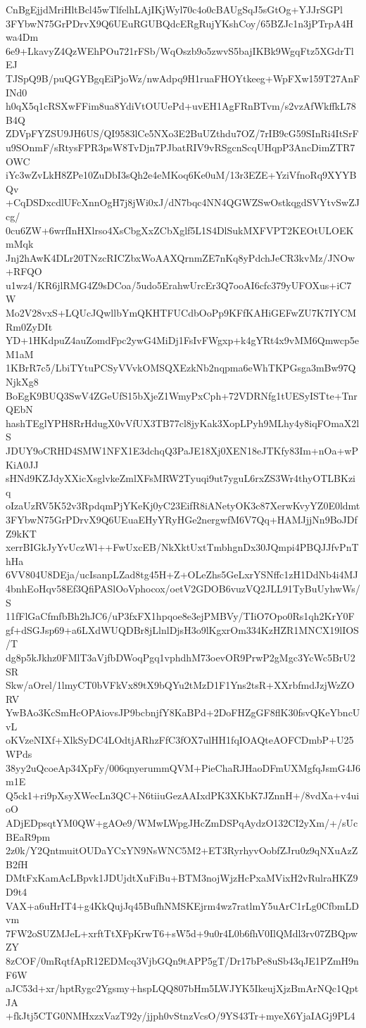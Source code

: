 CnBgEjjdMriHltBcl45wTlfelhLAjIKjWyl70c4o0cBAUgSqJ5sGtOg+YJJrSGPl
3FYbwN75GrPDrvX9Q6UEuRGUBQdcERgRujYKshCoy/65BZJc1n3jPTrpA4Hwa4Dm
6e9+LkavyZ4QzWEhPOu721rFSb/WqOszb9o5zwvS5bajIKBk9WgqFtz5XGdrTlEJ
TJSpQ9B/puQGYBgqEiPjoWz/nwAdpq9H1ruaFHOYtkeeg+WpFXw159T27AnFINd0
h0qX5q1cRSXwFFim8ua8YdiVtOUUePd+uvEH1AgFRnBTvm/s2vzAfWkffkL78B4Q
ZDVpFYZSU9JH6US/QI9583lCe5NXo3E2BuUZthdu7OZ/7rIB9cG59SInRi4ItSrF
u9SOnmF/sRtysFPR3psW8TvDjn7PJbatRIV9vRSgcnScqUHqpP3AncDimZTR7OWC
iYc3wZvLkH8ZPe10ZuDbI3sQh2e4eMKoq6Ke0uM/13r3EZE+YziVfnoRq9XYYBQv
+CqDSDxcdlUFcXnnOgH7j8jWi0xJ/dN7bqc4NN4QGWZSwOstkqgdSVYtvSwZJcg/
0cu6ZW+6wrfInHXlrso4XsCbgXxZCbXglf5L1S4DlSukMXFVPT2KEOtULOEKmMqk
Jnj2hAwK4DLr20TNzcRICZbxWoAAXQrnmZE7nKq8yPdchJeCR3kvMz/JNOw+RFQO
u1wz4/KR6jlRMG4Z9sDCoa/5udo5ErahwUrcEr3Q7ooAI6cfc379yUFOXus+iC7W
Mo2V28vxS+LQUcJQwllbYmQKHTFUCdbOoPp9KFfKAHiGEFwZU7K7IYCMRm0ZyDIt
YD+1HKdpuZ4auZomdFpc2ywG4MiDj1FsIvFWgxp+k4gYRt4x9vMM6Qmwcp5eM1aM
1KBrR7c5/LbiTYtuPCSyVVvkOMSQXEzkNb2nqpma6eWhTKPGsga3mBw97QNjkXg8
BoEgK9BUQ3SwV4ZGeUfS15bXjeZ1WmyPxCph+72VDRNfg1tUESyISTte+TnrQEbN
hashTEglYPH8RrHdugX0vVfUX3TB77cl8jyKak3XopLPyh9MLhy4y8iqFOmaX2lS
JDUY9oCRHD4SMW1NFX1E3dchqQ3PaJE18Xj0XEN18eJTKfy83Im+nOa+wPKiA0JJ
sHNd9KZJdyXXicXsglvkeZmlXFsMRW2Tyuqi9ut7yguL6rxZS3Wr4thyOTLBKziq
oIzaUzRV5K52v3RpdqmPjYKeKj0yC23EifR8iANetyOK3c87XerwKvyYZ0E0ldmt
3FYbwN75GrPDrvX9Q6UEuaEHyYRyHGe2nergwfM6V7Qq+HAMJjjNn9BoJDfZ9kKT
xerrBIGkJyYvUczWl++FwUxcEB/NkXktUxtTmbhgnDx30JQmpi4PBQJJfvPnThHa
6VV804U8DEja/ucIsanpLZad8tg45H+Z+OLeZhs5GeLxrYSNffc1zH1DdNb4i4MJ
4bnhEoHqv58Ef3QfiPASlOoVphocox/oetV2GDOB6vuzVQ2JLL91TyBuUyhwWs/S
11fFlGaCfmfbBh2hJC6/uP3fxFX1hpqoe8e3ejPMBVy/TIiO7Opo0Rs1qh2KrY0F
gf+dSGJsp69+a6LXdWUQDBr8jLlnlDjsH3o9lKgxrOm334KzHZR1MNCX19lIOS/T
dg8p5kJkhz0FMlT3aVjfbDWoqPgq1vphdhM73oevOR9PrwP2gMgc3YcWc5BrU2SR
Skw/aOrel/1lmyCT0bVFkVx89tX9bQYu2tMzD1F1Yns2tsR+XXrbfmdJzjWzZORV
YwBAo3KcSmHcOPAiovsJP9bcbnjfY8KaBPd+2DoFHZgGF8flK30fsvQKeYbncUvL
oKVzeNIXf+XlkSyDC4LOdtjARhzFfC3fOX7ulHH1fqIOAQteAOFCDmbP+U25WPds
38yy2uQcoeAp34XpFy/006qnyerummQVM+PieChaRJHaoDFmUXMgfqJsmG4J6m1E
Q5ck1+ri9pXsyXWecLn3QC+N6tiiuGezAAIxdPK3XKbK7JZnnH+/8vdXa+v4uioO
ADjEDpsqtYM0QW+gAOe9/WMwLWpgJHcZmDSPqAydzO132CI2yXm/+/sUcBEaR9pm
2z0k/Y2QntmuitOUDaYCxYN9NsWNC5M2+ET3RyrhyvOobfZJru0z9qNXuAzZB2fH
DMtFxKamAcLBpvk1JDUjdtXuFiBu+BTM3nojWjzHcPxaMVixH2vRulraHKZ9D9t4
VAX+a6uHrIT4+g4KkQujJq45BufhNMSKEjrm4wz7ratlmY5uArC1rLg0CfbmLDvm
7FW2oSUZMJeL+xrftTtXFpKrwT6+sW5d+9u0r4L0b6fhV0IlQMdl3rv07ZBQpwZY
8zCOF/0mRqtfApR12EDMcq3VjbGQn9tAPP5gT/Dr17bPe8uSb43qJE1PZmH9nF6W
aJC53d+xr/hptRygc2Ygsmy+hspLQQ807bHm5LWJYK5IkeujXjzBmArNQc1QptJA
+fkJtj5CTG0NMHxzxVazT92y/jjph0vStnzVcsO/9YS43Tr+myeX6YjaIAGj9PL4
